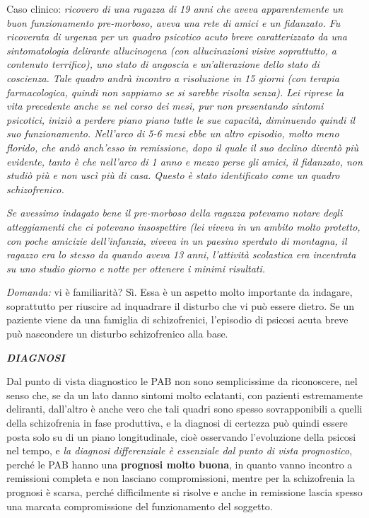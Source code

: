 \documentclass[]{article}
\begin{document}
Caso clinico: \emph{ricovero di una ragazza di 19 anni che aveva
apparentemente un buon funzionamento pre-morboso, aveva una rete di
amici e un fidanzato. Fu ricoverata di urgenza per un quadro psicotico
acuto breve caratterizzato da una sintomatologia delirante allucinogena
(con allucinazioni visive soprattutto, a contenuto terrifico), uno stato
di angoscia e un'alterazione dello stato di coscienza. Tale quadro andrà
incontro a risoluzione in 15 giorni (con terapia farmacologica, quindi
non sappiamo se si sarebbe risolta senza). Lei riprese la vita
precedente anche se nel corso dei mesi, pur non presentando sintomi
psicotici, iniziò a perdere piano piano tutte le sue capacità,
diminuendo quindi il suo funzionamento. Nell'arco di 5-6 mesi ebbe un
altro episodio, molto meno florido, che andò anch'esso in remissione,
dopo il quale il suo declino diventò più evidente, tanto è che nell'arco
di 1 anno e mezzo perse gli amici, il fidanzato, non studiò più e non
uscì più di casa. Questo è stato identificato come un quadro
schizofrenico.}

\emph{Se avessimo indagato bene il pre-morboso della ragazza potevamo
notare degli atteggiamenti che ci potevano insospettire (lei viveva in
un ambito molto protetto, con poche amicizie dell'infanzia, viveva in un
paesino sperduto di montagna, il ragazzo era lo stesso da quando aveva
13 anni, l'attività scolastica era incentrata su uno studio giorno e
notte per ottenere i minimi risultati. }

\emph{Domanda:} vi è familiarità? Sì. Essa è un aspetto molto importante
da indagare, soprattutto per riuscire ad inquadrare il disturbo che vi
può essere dietro. Se un paziente viene da una famiglia di
schizofrenici, l'episodio di psicosi acuta breve può nascondere un
disturbo schizofrenico alla base.

\textbf{\emph{DIAGNOSI}}

Dal punto di vista diagnostico le PAB non sono semplicissime da
riconoscere, nel senso che, se da un lato danno sintomi molto eclatanti,
con pazienti estremamente deliranti, dall'altro è anche vero che tali
quadri sono spesso sovrapponibili a quelli della schizofrenia in fase
produttiva, e la diagnosi di certezza può quindi essere posta solo su di
un piano longitudinale, cioè osservando l'evoluzione della psicosi nel
tempo, e \emph{la diagnosi differenziale è essenziale dal punto di vista
prognostico}, perché le PAB hanno una \textbf{prognosi molto buona}, in
quanto vanno incontro a remissioni completa e non lasciano
compromissioni, mentre per la schizofrenia la prognosi è scarsa, perché
difficilmente si risolve e anche in remissione lascia spesso una marcata
compromissione del funzionamento del soggetto.
\end{document}
